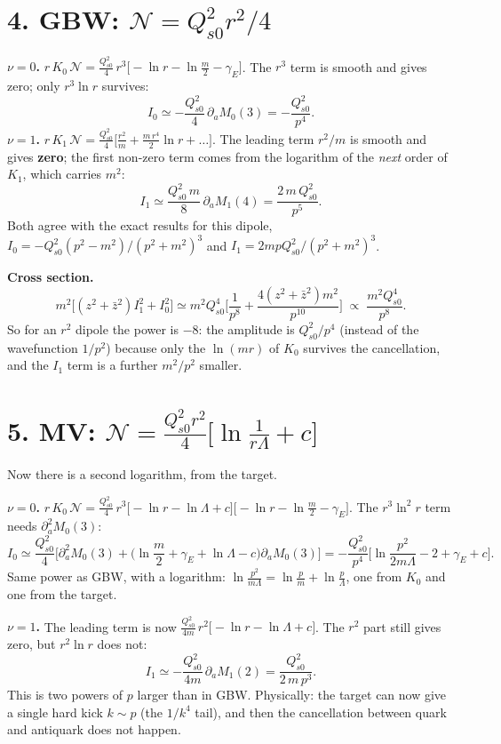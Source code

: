 \documentclass[12pt]{article}
\begin{document}
\section*{4. GBW: $\mathcal{N}=Q_{s0}^2r^2/4$}

\textbf{$\nu=0$.} $r\,K_0\,\mathcal N=\frac{Q_{s0}^2}{4}\,r^3\big[-\ln r-\ln\frac m2-\gamma_E\big]$.
The $r^3$ term is smooth and gives zero; only $r^3\ln r$ survives:
\[
  I_0\simeq-\frac{Q_{s0}^2}{4}\,\partial_aM_0(3)=-\frac{Q_{s0}^2}{p^4}.
\]
\textbf{$\nu=1$.} $r\,K_1\,\mathcal N=\frac{Q_{s0}^2}{4}\big[\frac{r^2}{m}+\frac{m\,r^4}{2}\ln r+\dots\big]$.
The leading term $r^2/m$ is smooth and gives \textbf{zero}; the first non-zero term comes from the
logarithm of the \emph{next} order of $K_1$, which carries $m^2$:
\[
  I_1\simeq\frac{Q_{s0}^2\,m}{8}\,\partial_aM_1(4)=\frac{2\,m\,Q_{s0}^2}{p^5}.
\]
Both agree with the exact results for this dipole,
$I_0=-Q_{s0}^2(p^2-m^2)/(p^2+m^2)^3$ and $I_1=2mpQ_{s0}^2/(p^2+m^2)^3$.

\textbf{Cross section.}
\[
  m^2\Big[(z^2+\bar z^2)I_1^2+I_0^2\Big]\simeq m^2Q_{s0}^4\Big[\frac{1}{p^8}+\frac{4(z^2+\bar z^2)m^2}{p^{10}}\Big]
  \;\propto\;\frac{m^2Q_{s0}^4}{p^8}.
\]
So for an $r^2$ dipole the power is $-8$: the amplitude is $Q_{s0}^2/p^4$ (instead of the wavefunction
$1/p^2$) because only the $\ln(mr)$ of $K_0$ survives the cancellation, and the $I_1$ term is a further
$m^2/p^2$ smaller.

\section*{5. MV: $\mathcal{N}=\frac{Q_{s0}^2r^2}{4}\big[\ln\frac{1}{r\Lambda}+c\big]$}

Now there is a second logarithm, from the target.

\textbf{$\nu=0$.} $r\,K_0\,\mathcal N=\frac{Q_{s0}^2}{4}\,r^3\big[-\ln r-\ln\Lambda+c\big]
\big[-\ln r-\ln\frac m2-\gamma_E\big]$. The $r^3\ln^2r$ term needs $\partial_a^2M_0(3)$:
\[
  I_0\simeq\frac{Q_{s0}^2}{4}\Big[\partial_a^2M_0(3)+\Big(\ln\frac m2+\gamma_E+\ln\Lambda-c\Big)\partial_aM_0(3)\Big]
  =-\frac{Q_{s0}^2}{p^4}\Big[\ln\frac{p^2}{2m\Lambda}-2+\gamma_E+c\Big].
\]
Same power as GBW, with a logarithm: $\ln\frac{p^2}{m\Lambda}=\ln\frac pm+\ln\frac p\Lambda$, one from
$K_0$ and one from the target.

\textbf{$\nu=1$.} The leading term is now $\frac{Q_{s0}^2}{4m}\,r^2\big[-\ln r-\ln\Lambda+c\big]$. The
$r^2$ part still gives zero, but $r^2\ln r$ does not:
\[
  I_1\simeq-\frac{Q_{s0}^2}{4m}\,\partial_aM_1(2)=\frac{Q_{s0}^2}{2\,m\,p^3}.
\]
This is two powers of $p$ larger than in GBW. Physically: the target can now give a single hard kick
$k\sim p$ (the $1/k^4$ tail), and then the cancellation between quark and antiquark does not
happen.
\end{document}
